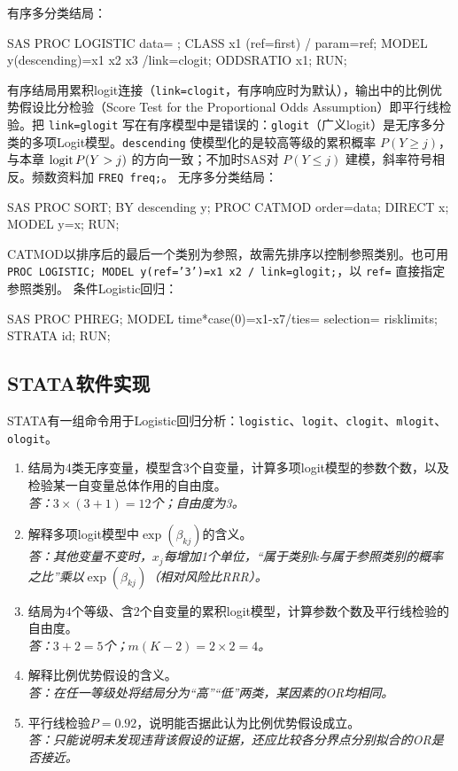 有序多分类结局：
\par\noindent
\begin{coursecode}{SAS}
PROC LOGISTIC data= ;
CLASS x1 (ref=first) / param=ref;
MODEL y(descending)=x1 x2 x3 /link=clogit;
ODDSRATIO x1;
RUN;
\end{coursecode}
\par
有序结局用累积logit连接（\texttt{link=clogit}，有序响应时为默认），输出中的比例优势假设比分检验（Score Test for the Proportional Odds Assumption）即平行线检验。把 \texttt{link=glogit} 写在有序模型中是错误的：\texttt{glogit}（广义logit）是无序多分类的多项Logit模型。\texttt{descending} 使模型化的是较高等级的累积概率 $P(Y\ge j)$，与本章 $\operatorname{logit} P(Y>j)$ 的方向一致；不加时SAS对 $P(Y\le j)$ 建模，斜率符号相反。频数资料加 \texttt{FREQ freq;}。
无序多分类结局：
\par\noindent
\begin{coursecode}{SAS}
PROC SORT;
BY descending y;
PROC CATMOD order=data;
DIRECT x;
MODEL y=x;
RUN;
\end{coursecode}
\par
CATMOD以排序后的最后一个类别为参照，故需先排序以控制参照类别。也可用 \texttt{PROC LOGISTIC; MODEL y(ref='3')=x1 x2 / link=glogit;}，以 \texttt{ref=} 直接指定参照类别。
条件Logistic回归：
\par\noindent
\begin{coursecode}{SAS}
PROC PHREG;
MODEL time*case(0)=x1-x7/ties= selection= risklimits;
STRATA id;
RUN;
\end{coursecode}
\par
\subsection{STATA软件实现}
STATA有一组命令用于Logistic回归分析：\texttt{logistic}、\texttt{logit}、\texttt{clogit}、\texttt{mlogit}、\texttt{ologit}。

\begin{fuxi}[复习题]
\begin{enumerate}
\item 结局为4类无序变量，模型含3个自变量，计算多项logit模型的参数个数，以及检验某一自变量总体作用的自由度。\\
\textit{答：$3\times(3+1)=12$个；自由度为3。}
\item 解释多项logit模型中$\exp(\beta_{kj})$的含义。\\
\textit{答：其他变量不变时，$x_j$每增加1个单位，“属于类别$k$与属于参照类别的概率之比”乘以$\exp(\beta_{kj})$（相对风险比RRR）。}
\item 结局为4个等级、含2个自变量的累积logit模型，计算参数个数及平行线检验的自由度。\\
\textit{答：$3+2=5$个；$m(K-2)=2\times2=4$。}
\item 解释比例优势假设的含义。\\
\textit{答：在任一等级处将结局分为“高”“低”两类，某因素的OR均相同。}
\item 平行线检验$P=0.92$，说明能否据此认为比例优势假设成立。\\
\textit{答：只能说明未发现违背该假设的证据，还应比较各分界点分别拟合的OR是否接近。}
\end{enumerate}
\end{fuxi}
